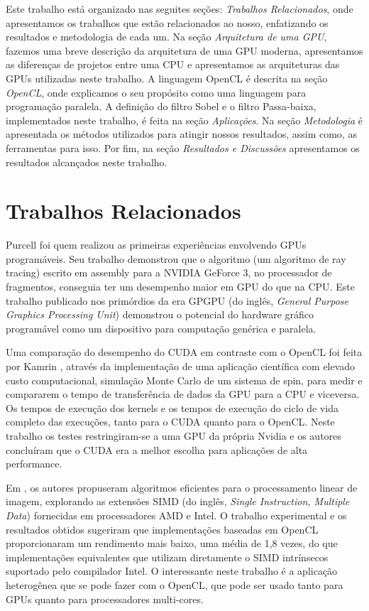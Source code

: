 Este trabalho está organizado nas seguites seções: \textit{Trabalhos Relacionados}, onde apresentamos os trabalhos que estão relacionados ao nosso, enfatizando os resultados e metodologia de cada um. Na seção \textit{Arquitetura de uma GPU}, fazemos uma breve descrição da arquitetura de uma GPU moderna, apresentamos as diferenças de projetos entre uma CPU e  apresentamos as arquiteturas das GPUs utilizadas neste trabalho. A linguagem OpenCL é descrita na seção \textit{OpenCL}, onde explicamos o seu propósito como uma linguagem para programação paralela. A definição do filtro Sobel e o filtro Passa-baixa, implementados neste trabalho, é feita na seção \textit{Aplicações}. Na seção \textit{Metodologia} é apresentada os métodos utilizados para atingir nossos resultados, assim como, as ferramentas para isso. Por fim, na seção \textit{Resultados e Discussões} apresentamos os resultados alcançados neste trabalho.

\section{Trabalhos Relacionados}
Purcell \cite{Purcell:2002:RTP:566654.566640} foi quem realizou as primeiras experiências envolvendo GPUs programáveis. Seu trabalho demonstrou que o algoritmo (um algoritmo de  ray tracing)  escrito em  assembly  para a  NVIDIA GeForce 3,  no processador de fragmentos, conseguia ter um desempenho maior em GPU do que na CPU. Este trabalho publicado nos primórdios da era GPGPU (do inglês, \textit{General Purpose Graphics Processing Unit}) demonstrou o  potencial do hardware gráfico programável como um dispositivo para computação genérica e paralela. 

Uma comparação do desempenho do CUDA em contraste com o OpenCL foi feita por Kamrin \cite{CudaOpenCl}, através da implementação de uma aplicação científica com elevado custo computacional, simulação Monte Carlo de um sistema de spin, para  medir e compararem o tempo de transferência de dados da GPU para a CPU e viceversa. Os tempos de execução dos  kernels e os tempos de execução do ciclo de vida completo das execuções, tanto para o CUDA quanto para o OpenCL. Neste trabalho os testes restringiram-se a uma GPU da própria Nvidia e os autores concluíram que o CUDA era a melhor escolha para aplicações de alta performance. 

Em \cite{SIMD}, os autores propuseram algoritmos eficientes para  o  processamento  linear  de imagem, explorando as extensões SIMD (do inglês, \textit{Single Instruction, Multiple Data}) fornecidas em processadores AMD e Intel.  O trabalho experimental e os resultados obtidos sugeriram  que  implementações baseadas em OpenCL proporcionaram um rendimento mais baixo, uma média de 1,8 vezes, do que implementações equivalentes que utilizam diretamente o SIMD intrínsecos suportado pelo compilador Intel. 
O interessante neste trabalho é a aplicação heterogênea que se pode fazer com o OpenCL, que pode ser usado tanto para GPUs quanto para processadores multi-cores. 

